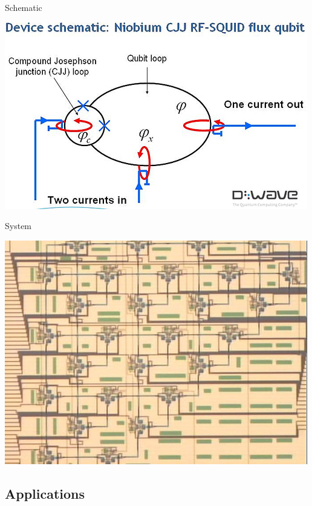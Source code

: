 \documentclass{beamer}
\begin{document}
\begin{frame}{Schematic}
 \begin{center}
  \includegraphics[scale=.7]{../img/Qubit_Schematic}
 \end{center}

\end{frame}

\begin{frame}{System}
 \begin{center}
  \includegraphics[scale=.7]{../img/Qubit_System}
 \end{center}

\end{frame}

\subsection{Applications}
\end{document}
